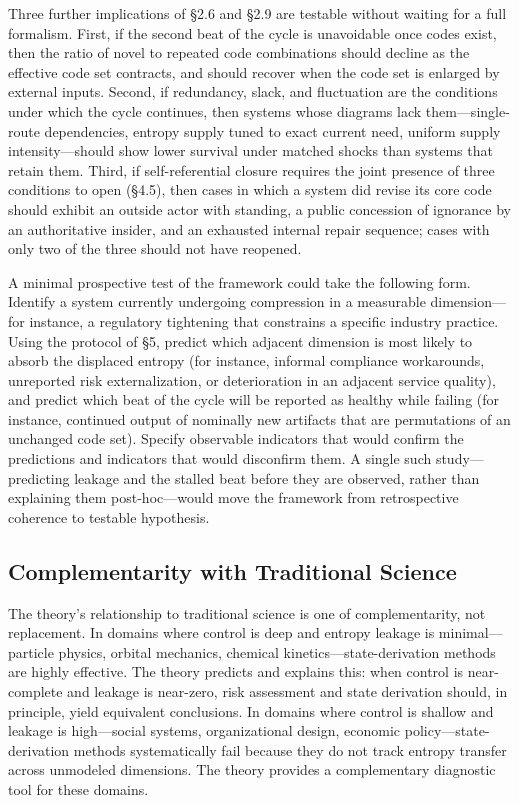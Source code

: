 \documentclass[11pt,a4paper]{article}
\begin{document}
Three further implications of \S2.6 and \S2.9 are testable without waiting for a full formalism. First, if the second beat of the cycle is unavoidable once codes exist, then the ratio of novel to repeated code combinations should decline as the effective code set contracts, and should recover when the code set is enlarged by external inputs. Second, if redundancy, slack, and fluctuation are the conditions under which the cycle continues, then systems whose diagrams lack them---single-route dependencies, entropy supply tuned to exact current need, uniform supply intensity---should show lower survival under matched shocks than systems that retain them. Third, if self-referential closure requires the joint presence of three conditions to open (\S4.5), then cases in which a system did revise its core code should exhibit an outside actor with standing, a public concession of ignorance by an authoritative insider, and an exhausted internal repair sequence; cases with only two of the three should not have reopened.

A minimal prospective test of the framework could take the following form. Identify a system currently undergoing compression in a measurable dimension---for instance, a regulatory tightening that constrains a specific industry practice. Using the protocol of \S5, predict which adjacent dimension is most likely to absorb the displaced entropy (for instance, informal compliance workarounds, unreported risk externalization, or deterioration in an adjacent service quality), and predict which beat of the cycle will be reported as healthy while failing (for instance, continued output of nominally new artifacts that are permutations of an unchanged code set). Specify observable indicators that would confirm the predictions and indicators that would disconfirm them. A single such study---predicting leakage and the stalled beat before they are observed, rather than explaining them post-hoc---would move the framework from retrospective coherence to testable hypothesis.

\subsection{Complementarity with Traditional Science}

The theory's relationship to traditional science is one of complementarity, not replacement. In domains where control is deep and entropy leakage is minimal---particle physics, orbital mechanics, chemical kinetics---state-derivation methods are highly effective. The theory predicts and explains this: when control is near-complete and leakage is near-zero, risk assessment and state derivation should, in principle, yield equivalent conclusions. In domains where control is shallow and leakage is high---social systems, organizational design, economic policy---state-derivation methods systematically fail because they do not track entropy transfer across unmodeled dimensions. The theory provides a complementary diagnostic tool for these domains.
\end{document}
